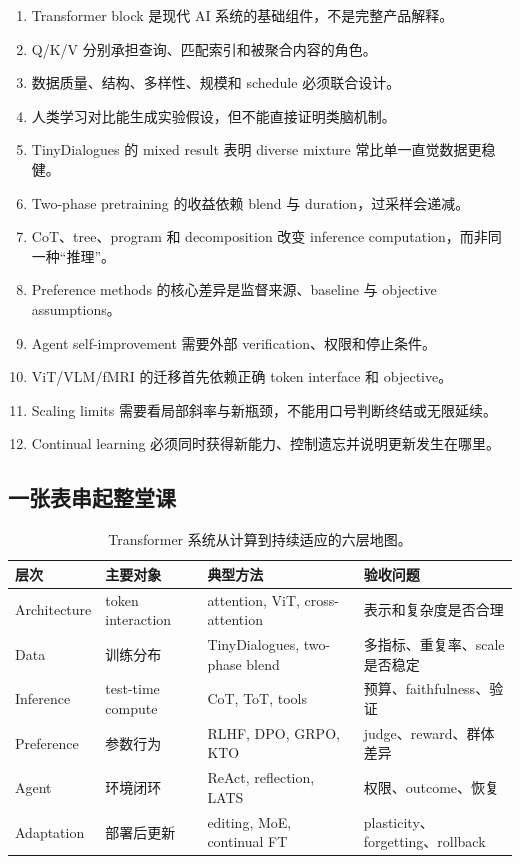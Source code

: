 \documentclass[a4paper]{article}
\begin{document}
\begin{enumerate}
  \item Transformer block 是现代 AI 系统的基础组件，不是完整产品解释。
  \item Q/K/V 分别承担查询、匹配索引和被聚合内容的角色。
  \item 数据质量、结构、多样性、规模和 schedule 必须联合设计。
  \item 人类学习对比能生成实验假设，但不能直接证明类脑机制。
  \item TinyDialogues 的 mixed result 表明 diverse mixture 常比单一直觉数据更稳健。
  \item Two-phase pretraining 的收益依赖 blend 与 duration，过采样会递减。
  \item CoT、tree、program 和 decomposition 改变 inference computation，而非同一种“推理”。
  \item Preference methods 的核心差异是监督来源、baseline 与 objective assumptions。
  \item Agent self-improvement 需要外部 verification、权限和停止条件。
  \item ViT/VLM/fMRI 的迁移首先依赖正确 token interface 和 objective。
  \item Scaling limits 需要看局部斜率与新瓶颈，不能用口号判断终结或无限延续。
  \item Continual learning 必须同时获得新能力、控制遗忘并说明更新发生在哪里。
\end{enumerate}

\subsection{一张表串起整堂课}

\begin{table}[H]
\centering
\small
\begin{tabular}{@{}L{0.17\textwidth}L{0.20\textwidth}L{0.28\textwidth}L{0.25\textwidth}@{}}
\toprule
层次 & 主要对象 & 典型方法 & 验收问题 \\
\midrule
Architecture & token interaction & attention, ViT, cross-attention & 表示和复杂度是否合理 \\
Data & 训练分布 & TinyDialogues, two-phase blend & 多指标、重复率、scale 是否稳定 \\
Inference & test-time compute & CoT, ToT, tools & 预算、faithfulness、验证 \\
Preference & 参数行为 & RLHF, DPO, GRPO, KTO & judge、reward、群体差异 \\
Agent & 环境闭环 & ReAct, reflection, LATS & 权限、outcome、恢复 \\
Adaptation & 部署后更新 & editing, MoE, continual FT & plasticity、forgetting、rollback \\
\bottomrule
\end{tabular}
\caption{Transformer 系统从计算到持续适应的六层地图。}
\end{table}
\end{document}
